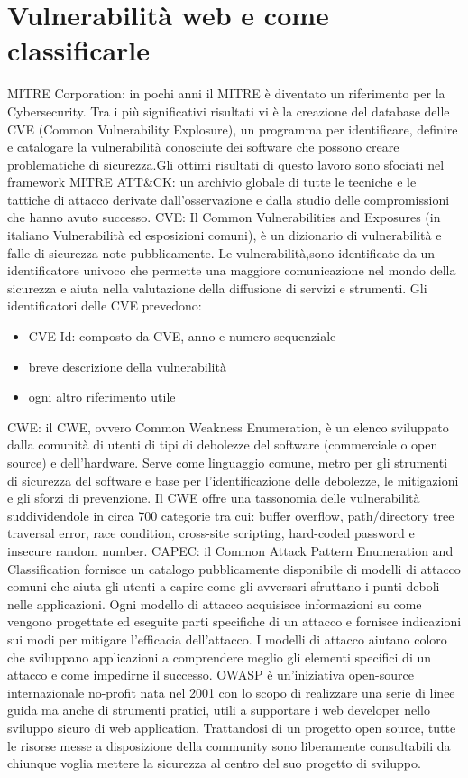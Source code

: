 \section{Vulnerabilità web e come classificarle} 
\cite{MITRE&CVE}
\cite{CVE}
MITRE Corporation: in pochi anni il MITRE è diventato un riferimento per la Cybersecurity. Tra i più significativi risultati vi è la creazione del database delle CVE (Common Vulnerability Explosure), un programma per identificare, definire e catalogare la vulnerabilità conosciute dei software che possono creare problematiche di sicurezza.Gli ottimi risultati di questo lavoro sono sfociati nel framework MITRE ATT\&CK: un archivio globale di tutte le tecniche e le tattiche di attacco derivate dall’osservazione e dalla studio delle compromissioni che hanno avuto successo.
CVE: Il Common Vulnerabilities and Exposures (in italiano Vulnerabilità ed esposizioni comuni), è un dizionario di vulnerabilità e falle di sicurezza note pubblicamente. Le vulnerabilità,sono identificate da un identificatore univoco che permette una maggiore comunicazione nel mondo della sicurezza e aiuta nella valutazione della diffusione di servizi e strumenti. Gli identificatori delle CVE prevedono:
\begin{itemize}
    \item CVE Id: composto da CVE, anno e numero sequenziale
    \item breve descrizione della vulnerabilità
    \item ogni altro riferimento utile 
\end{itemize}
\cite{rischiodigitale}
CWE: il CWE, ovvero Common Weakness Enumeration, è un elenco sviluppato dalla comunità di utenti di tipi di debolezze del software (commerciale o open source) e dell’hardware. Serve come linguaggio comune, metro per gli strumenti di sicurezza del software e base per l’identificazione delle debolezze, le mitigazioni e gli sforzi di prevenzione. Il CWE offre una tassonomia delle vulnerabilità suddividendole in circa 700 categorie tra cui: buffer overflow, path/directory tree traversal error, race condition, cross-site scripting, hard-coded password e insecure random number.
CAPEC: il Common Attack Pattern Enumeration and Classification fornisce un catalogo pubblicamente disponibile di modelli di attacco comuni che aiuta gli utenti a capire come gli avversari sfruttano i punti deboli nelle applicazioni.
Ogni modello di attacco acquisisce informazioni su come vengono progettate ed eseguite parti specifiche di un attacco e fornisce indicazioni sui modi per mitigare l'efficacia dell'attacco. I modelli di attacco aiutano coloro che sviluppano applicazioni a comprendere meglio gli elementi specifici di un attacco e come impedirne il successo.
OWASP è un’iniziativa open-source internazionale no-profit nata nel 2001 con lo scopo di realizzare una serie di linee guida ma anche di strumenti pratici, utili a supportare i web developer nello sviluppo sicuro di web application.
Trattandosi di un progetto open source, tutte le risorse messe a disposizione della community sono liberamente consultabili da chiunque voglia mettere la sicurezza al centro del suo progetto di sviluppo.

